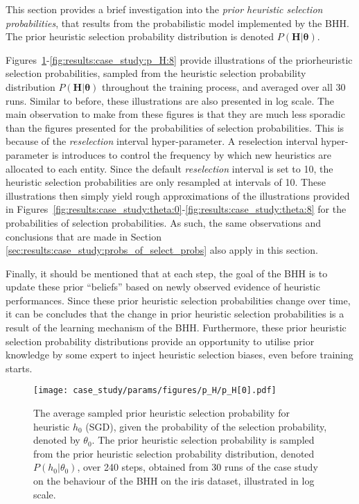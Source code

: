 This section provides a brief investigation into the \textit{prior heuristic selection probabilities}, that results from the probabilistic model implemented by the \acs{BHH}. The prior heuristic selection probability distribution is denoted $P(\boldsymbol{H} \vert \boldsymbol{\theta})$.

Figures~\ref{fig:results:case_study:p_H:0}-\ref{fig:results:case_study:p_H:8} provide illustrations of the priorheuristic selection probabilities, sampled from the heuristic selection probability distribution $P(\boldsymbol{H} \vert \boldsymbol{\theta})$ throughout the training process, and averaged over all 30 runs. Similar to before, these illustrations are also presented in log scale. The main observation to make from these figures is that they are much less sporadic than the figures presented for the probabilities of selection probabilities. This is because of the \textit{reselection} interval hyper-parameter. A reselection interval hyper-parameter is introduces to control the frequency by which new heuristics are allocated to each entity. Since the default \textit{reselection} interval is set to 10, the heuristic selection probabilities are only resampled at intervals of 10. These illustrations then simply yield rough approximations of the illustrations provided in Figures~\ref{fig:results:case_study:theta:0}-\ref{fig:results:case_study:theta:8} for the probabilities of selection probabilities. As such, the same observations and conclusions that are made in Section \ref{sec:results:case_study:probs_of_select_probs} also apply in this section.

Finally, it should be mentioned that at each step, the goal of the \acs{BHH} is to update these prior ``beliefs'' based on newly observed evidence of heuristic performances. Since these prior heuristic selection probabilities change over time, it can be concludes that the change in prior heuristic selection probabilities is a result of the learning mechanism of the \acs{BHH}. Furthermore, these prior heuristic selection probability distributions provide an opportunity to utilise prior knowledge by some expert to inject heuristic selection biases, even before training starts.

\begin{figure}[htpb]
	\centering
	\texttt{[image: case\_study/params/figures/p\_H/p\_H[0].pdf]}
	\caption{The average sampled prior heuristic selection probability for heuristic $h_{0}$ (\acs{SGD}), given the probability of the selection probability, denoted by $\theta_{0}$. The prior heuristic selection probability is sampled from the prior heuristic selection probability distribution, denoted $P(h_{0} \vert \theta_{0})$, over 240 steps, obtained from 30 runs of the case study on the behaviour of the \acs{BHH} on the iris dataset, illustrated in log scale.}
	\label{fig:results:case_study:p_H:0}
\end{figure}

